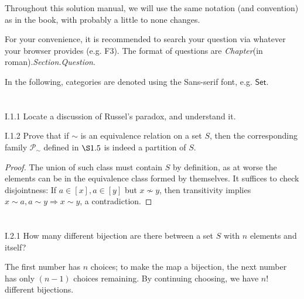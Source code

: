 Throughout this solution manual, we will use the same notation (and convention) as in the book, with probably a little to none changes.

For your convenience, it is recommended to search your question via whatever your browser provides (e.g. F3). The format of questions are \textit{Chapter}(in roman).\textit{Section.Question}.

In the following, categories are denoted using the \textsf{Sans-serif} font, e.g. $\mathsf{Set}$.

\section{}
\begin{problem}{I.1.1}
Locate a discussion of Russel's paradox, and understand it.
\end{problem}

\begin{problem}{I.1.2}
Prove that if $\sim$ is an equivalence relation on a set $S$, then the corresponding family $\mathscr{P}_\sim$ defined in $\S 1.5$ is indeed a partition of $S$.
\end{problem}
\begin{proof}
The union of such class must contain $S$ by definition, as at worse the elements can be in the equivalence class formed by themselves. It suffices to check disjointness: If $a \in [x], a \in [y]$ but $x \nsim y$, then transitivity implies $x \sim a, a \sim y \Rightarrow x \sim y$, a contradiction. 
\end{proof}

\section{}
\begin{problem}{I.2.1}
How many different bijection are there between a set $S$ with $n$ elements and itself?
\end{problem}
\begin{solution}
The first number has $n$ choices; to make the map a bijection, the next number has only $(n-1)$ choices remaining. By continuing choosing, we have $n!$ different bijections.
\end{solution}

